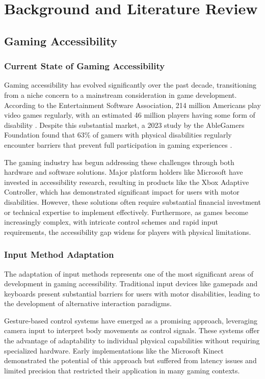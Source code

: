 \chapter{Background and Literature Review}

\section{Gaming Accessibility}
\subsection{Current State of Gaming Accessibility}
Gaming accessibility has evolved significantly over the past decade, transitioning from a niche concern to a mainstream consideration in game development. According to the Entertainment Software Association, 214 million Americans play video games regularly, with an estimated 46 million players having some form of disability \cite{esasurvey2022}. Despite this substantial market, a 2023 study by the AbleGamers Foundation found that 63\% of gamers with physical disabilities regularly encounter barriers that prevent full participation in gaming experiences \cite{ablegamers2023survey}.

The gaming industry has begun addressing these challenges through both hardware and software solutions. Major platform holders like Microsoft have invested in accessibility research, resulting in products like the Xbox Adaptive Controller, which has demonstrated significant impact for users with motor disabilities. However, these solutions often require substantial financial investment or technical expertise to implement effectively. Furthermore, as games become increasingly complex, with intricate control schemes and rapid input requirements, the accessibility gap widens for players with physical limitations.

\subsection{Input Method Adaptation}
The adaptation of input methods represents one of the most significant areas of development in gaming accessibility. Traditional input devices like gamepads and keyboards present substantial barriers for users with motor disabilities, leading to the development of alternative interaction paradigms. 

Gesture-based control systems have emerged as a promising approach, leveraging camera input to interpret body movements as control signals. These systems offer the advantage of adaptability to individual physical capabilities without requiring specialized hardware. Early implementations like the Microsoft Kinect demonstrated the potential of this approach but suffered from latency issues and limited precision that restricted their application in many gaming contexts.

